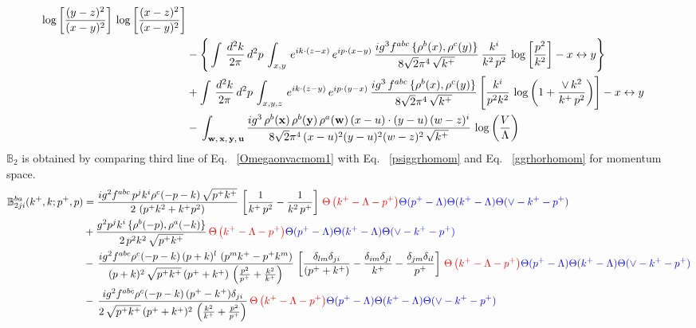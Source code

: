 \documentclass[10pt]{article}
\def\mf#1{\mathbb{#1}}
\numberwithin{equation}{section}
\begin{document}
\begin{align}
\log{\left[\frac{(y-z)^{2}}{(x-y)^{2}}\right]}\,\log{\left[\frac{(x-z)^{2}}{(x-y)^{2}}\right]} \notag \\ & -\Bigg\{ \int\, \frac{d^{2}k}{2\pi}\, d^{2}p\, \int_{x,y}\, e^{ik\cdot (z-x)}\, e^{ip\cdot (x-y)}\, \frac{ig^{3}f^{abc}\,\{\rho^{b}(x),\rho^{c}(y)\}}{8\sqrt{2}\pi^{4}\, \sqrt{k^{+}}}\, \frac{k^{i}}{k^{2}\,p^{2}}\, \log{\left[\frac{p^{2}}{k^{2}}\right]}-x\leftrightarrow y \Bigg\}\notag \\ & +  \int\, \frac{d^{2}k}{2\pi}\, d^{2}p\, \int_{x,y,z}\,e^{ik\cdot (z-y)}\, e^{ip\cdot (y-x)}\, \frac{ig^{3}\,f^{abc}\,\{\rho^{b}(x),\rho^{c}(y)\}}{8\sqrt{2}\pi^{4}\,\sqrt{k^{+}}}\, \Bigg[\frac{k^{i}}{p^{2}k^{2}}\,\log{\left(1+\frac{\vee\, k^{2}}{k^{+}\, p^{2}}\right)}\Bigg]-x\leftrightarrow y \notag \\ & -\,\int_{\mathbf{w},\, \mathbf{x},\, \mathbf{y},\, \mathbf{u}}\frac{ig^{3}\,\rho^{b}(\mathbf{x})\,\rho^{b}(\mathbf{y})\,\rho^{a}(\mathbf{w})\, (x-u)\cdot (y-u)\,(w-z)^{i}}{8\sqrt{2}\pi^{4}\,(x-u)^{2}(y-u)^{2}(w-z)^{2}\,\sqrt{k^{+}}}\,\log{\left(\frac{V}{\Lambda}\right)}
\end{align}
$\mf{B}_{2}$ is obtained by comparing third line of Eq.~ \eqref{Omegaonvacmom1} with Eq.~ \eqref{psiggrhomom} and Eq.~ \eqref{ggrhorhomom} for momentum space.
\begin{align}
    \mf{B}^{ba}_{2ji}(k^{+},k;p^{+},p) & =  \frac{ig^{2}f^{abc}\,p^{j}k^{i}\rho^{c}(-p-k)\, \sqrt{p^{+}k^{+}}}{2\,\left(p^{+}k^{2}+k^{+}p^{2}\right)}\,\left[\frac{1}{k^{+}\,p^{2}} - \frac{1}{k^{2}\,p^{+}}\right]\,\textcolor{red}{\Theta\left(k^{+}-\Lambda-p^{+}\right)}\textcolor{blue}{\Theta(p^{+}-\Lambda)\Theta(k^{+}-\Lambda)\Theta(\vee-k^{+}-p^{+})}\notag \\ & + \frac{g^{2}p^{j}k^{i}\,\{\rho^{b}(-p),\rho^{a}(-k)\}}{2\,p^{2}k^{2}\, \sqrt{p^{+}k^{+}}}\,\textcolor{red}{\Theta\left(k^{+}-\Lambda-p^{+}\right)}\textcolor{blue}{\Theta(p^{+}-\Lambda)\Theta(k^{+}-\Lambda)\Theta(\vee-k^{+}-p^{+})}\notag \\ & -\,\frac{ig^{2}f^{abc}\rho^{c}(-p-k)\,(p+k)^{l}\,\left(p^{m}k^{+}-p^{+}k^{m}\right)}{(p+k)^{2}\,\sqrt{p^{+}k^{+}}\,(p^{+}+k^{+})\,\left(\frac{p^{2}}{p^{+}}+\frac{k^{2}}{k^{+}}\right)}\,\left[\frac{\delta_{lm}\delta_{ji}}{(p^{+}+k^{+})} - \frac{\delta_{im}\delta_{jl}}{k^{+}} - \frac{\delta_{jm}\delta_{il}}{p^{+}}\right]\,\textcolor{red}{\Theta\left(k^{+}-\Lambda-p^{+}\right)}\textcolor{blue}{\Theta(p^{+}-\Lambda)\Theta(k^{+}-\Lambda)\Theta(\vee-k^{+}-p^{+})}\notag \\ & -\,\frac{ig^{2}f^{abc}\rho^{c}(-p-k)\,(p^{+}-k^{+})\delta_{ji}}{2\,\sqrt{p^{+}k^{+}}\,(p^{+}+k^{+})^{2}\,\left(\frac{k^{2}}{k^{+}}+\frac{p^{2}}{p^{+}}\right)}\,\textcolor{red}{\Theta\left(k^{+}-\Lambda-p^{+}\right)}\textcolor{blue}{\Theta(p^{+}-\Lambda)\Theta(k^{+}-\Lambda)\Theta(\vee-k^{+}-p^{+})}
\end{align}
\end{document}

